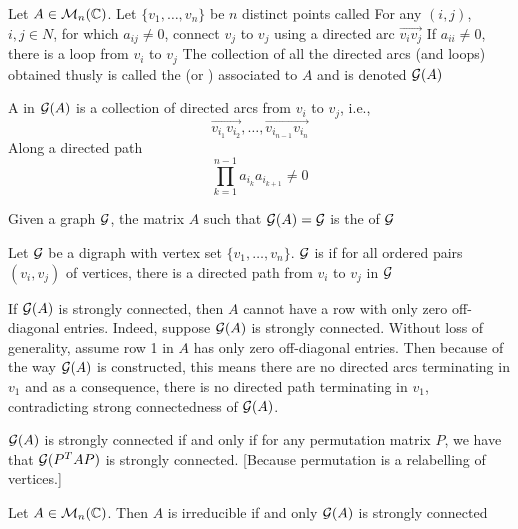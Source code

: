 \documentclass[aspectratio=169]{beamer}
\begin{document}
\begin{frame}
Let $A\in \mathcal{M}_{n}(\mathbb{C})$. Let $\{v_1, \ldots, v_n\}$ be $n$ distinct points called 
\vfill
For any $(i,j)$, $i,j\in N$, for which $a_{ij}\neq 0$, connect $v_j$ to $v_j$ using a directed arc $\overrightarrow{v_i v_j}$
\vfill
If $a_{ii}\neq 0$, there is a loop from $v_i$ to $v_j$
\vfill
The collection of all the directed arcs (and loops) obtained thusly is called the  (or ) associated to $A$ and is denoted $\mathcal{G}(A)$
\end{frame}


\begin{frame}
A  in $\mathcal{G}(A)$ is a collection of directed arcs from $v_i$ to $v_j$, i.e., 
\[
\overrightarrow{v_{i_1}v_{i_2}}, \ldots,\overrightarrow{v_{i_{n-1}}v_{i_n}}
\] 
\vfill
Along a directed path
\[
\prod\limits_{k=1}^{n-1} a_{i_k}a_{i_{k+1}}\neq 0
\]
\vfill
\begin{remark}
Given a graph $\mathcal{G}$, the matrix $A$ such that $\mathcal{G}(A)=\mathcal{G}$ is the  of $\mathcal{G}$
\end{remark}
\end{frame} 

\begin{frame}
\begin{definition}
Let $\mathcal{G}$ be a digraph with vertex set $\{v_1, \ldots, v_n\}$. $\mathcal{G}$ is  if for all ordered pairs $(v_i,v_j)$ of vertices, there is a directed path from $v_i$ to $v_j$ in $\mathcal{G}$
\end{definition} 
\vfill
\begin{remark}
If $\mathcal{G}(A)$ is strongly connected, then $A$ cannot have a row with only zero off-diagonal entries. Indeed, suppose $\mathcal{G}(A)$ is strongly connected. Without loss of generality, assume row 1 in $A$ has only zero off-diagonal entries. Then because of the way $\mathcal{G}(A)$ is constructed, this means there are no directed arcs terminating in $v_1$ and as a consequence, there is no directed path terminating in $v_1$, contradicting strong connectedness of $\mathcal{G}(A)$.
\end{remark}
\end{frame}
 
\begin{frame} 
\begin{remark}
$\mathcal{G}(A)$ is strongly connected if and only if for any permutation matrix $P$, we have that $\mathcal{G}(P^TAP)$ is strongly connected. [Because permutation is a relabelling of vertices.]
\end{remark}
\vfill
\begin{theorem}\label{th:A_irreducible_iff_GA_stronglyConnected}
Let $A\in \mathcal{M}_{n}(\mathbb{C})$. Then $A$ is irreducible if and only $\mathcal{G}(A)$ is strongly connected
\end{theorem}
\end{frame}
\end{document}
